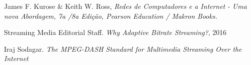 \documentclass[12pt]{article}
\begin{document}
\begin{thebibliography}{9}

\noindent James F. Kurose \& Keith W. Ross, 
\textit{Redes de Computadores e a Internet - Uma nova Abordagem, 7a /8a Edição, Pearson Education / Makron Books.}

\noindent Streaming Media Editorial Staff.
\textit{Why Adaptive Bitrate Streaming?}, 2016

\noindent Iraj Sodagar.
\textit{The MPEG-DASH Standard for Multimedia Streaming Over the Internet}

\end{thebibliography}
\end{document}
